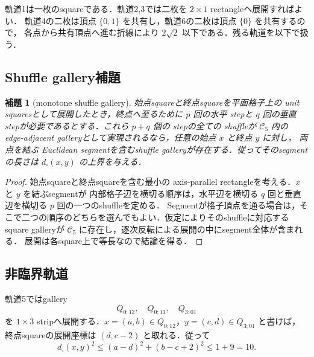 \documentclass[a4paper,11pt]{ltjsarticle}
\numberwithin{equation}{section}
\theoremstyle{plain}
\newtheorem{lemma}[lemma]{補題}
\theoremstyle{definition}
\theoremstyle{remark}
\newcommand{\cC}{\mathcal C}
\begin{document}
軌道1は一枚のsquareである．軌道2,3では二枚を $2\times1$ rectangleへ展開すればよい．
軌道4の二枚は頂点 $\{0,1\}$ を共有し，軌道6の二枚は頂点 $\{0\}$ を共有するので，
各点から共有頂点へ進む折線により $2\sqrt2$ 以下である．残る軌道を以下で扱う．

\subsection{Shuffle gallery補題}

\begin{lemma}[monotone shuffle gallery]\label{lem:shuffle-gallery}
始点squareと終点squareを平面格子上の unit squaresとして展開したとき，終点へ至るために
$p$ 回の水平 stepと $q$ 回の垂直 stepが必要であるとする．これら $p+q$ 個の stepの全ての shuffleが
$\cC_5$ 内の edge-adjacent galleryとして実現されるなら，任意の始点 $x$ と終点 $y$ に対し，
両点を結ぶ Euclidean segmentを含むshuffle galleryが存在する．従ってそのsegmentの長さは
$d_\square(x,y)$ の上界を与える．
\end{lemma}

\begin{proof}
始点squareと終点squareを含む最小の axis-parallel rectangleを考える．$x$ と $y$ を結ぶsegmentが
内部格子辺を横切る順序は，水平辺を横切る $q$ 回と垂直辺を横切る $p$ 回の一つのshuffleを定める．
Segmentが格子頂点を通る場合は，そこで二つの順序のどちらを選んでもよい．仮定によりそのshuffleに対応する
square galleryが $\cC_5$ に存在し，逐次反転による展開の中にsegment全体が含まれる．
展開は各square上で等長なので結論を得る．
\end{proof}

\subsection{非臨界軌道}

軌道5ではgallery
\begin{equation}\label{eq:orbit5-gallery}
 Q_{0;12},\quad Q_{0;13},\quad Q_{3;01}
\end{equation}
を $1\times3$ stripへ展開する．$x=(a,b)\in Q_{0;12}$，$y=(c,d)\in Q_{3;01}$ と書けば，
終点squareの展開座標は $(d,c-2)$ と取れる．従って
\begin{equation}\label{eq:orbit5-bound}
 d_\square(x,y)^2
 \le (a-d)^2+(b-c+2)^2
 \le 1+9=10.
\end{equation}
\end{document}
